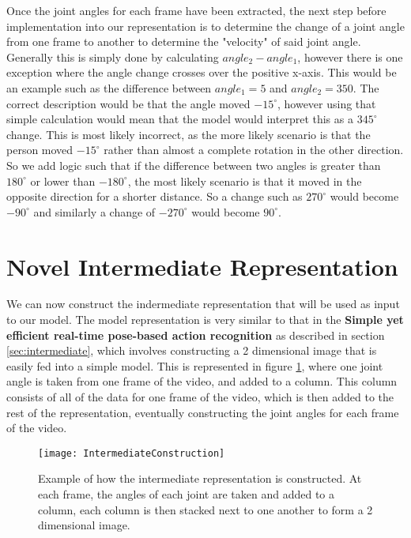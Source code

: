Once the joint angles for each frame have been extracted, the next step before implementation into our representation is to determine the change of a joint angle from one frame to another to determine the "velocity" of said joint angle. Generally this is simply done by calculating $angle_2 - angle_1$, however there is one exception where the angle change crosses over the positive x-axis. This would be an example such as the difference between $angle_1 = 5$ and $angle_2 = 350$. The correct description would be that the angle moved $-15^\circ$, however using that simple calculation would mean that the model would interpret this as a $345^\circ$ change. This is most likely incorrect, as the more likely scenario is that the person moved $-15^\circ$ rather than almost a complete rotation in the other direction. So we add logic such that if the difference between two angles is greater than $180^\circ$ or lower than $-180^\circ$, the most likely scenario is that it moved in the opposite direction for a shorter distance. So a change such as $270^\circ$ would become $-90^\circ$ and similarly a change of $-270^\circ$ would become $90^\circ$.

\section{Novel Intermediate Representation}

We can now construct the indermediate representation that will be used as input to our model. The model representation is very similar to that in the \textbf{Simple yet efficient real-time pose-based action recognition} \cite{simple_yet_efficient} as described in section \ref{sec:intermediate}, which involves constructing a 2 dimensional image that is easily fed into a simple model. This is represented in figure \ref{fig:intermediate-construction}, where one joint angle is taken from one frame of the video, and added to a column. This column consists of all of the data for one frame of the video, which is then added to the rest of the representation, eventually constructing the joint angles for each frame of the video.

\begin{figure}[ht]
	\texttt{[image: IntermediateConstruction]}
	\centering
	\caption{Example of how the intermediate representation is constructed. At each frame, the angles of each joint are taken and added to a column, each column is then stacked next to one another to form a 2 dimensional image.}
	\label{fig:intermediate-construction}
\end{figure}

